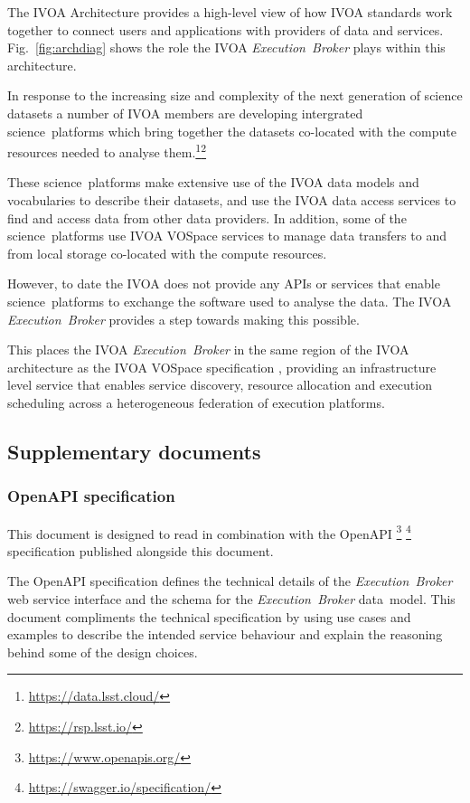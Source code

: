 \documentclass[11pt,a4paper]{ivoa}
\newcommand{\openapi} {OpenAPI}
\newcommand{\datamodel} {data~model}
\newcommand{\webservice} {web service}
\newcommand{\ivoa} {IVOA}
\newcommand{\vospace} {VOSpace}
\newcommand{\executionbroker} {\textit{Execution~Broker}}
\newcommand{\footurl}[1] {\footnote{\url{#1}}}
\newcommand{\dataset}[1] {dataset#1}
\newcommand{\scienceplatform}[1] {science~platform#1}
\begin{document}
The \ivoa{} Architecture\citep{2010ivoa.rept.1123A} provides a high-level view of how \ivoa{}
standards work together to connect users and applications with providers of data
and services.
Fig.~\ref{fig:archdiag} shows the role the \ivoa{} \executionbroker{} plays within this architecture.

In response to the increasing size and complexity of the next generation of science \dataset{s}
a number of \ivoa{} members are developing intergrated \scienceplatform{s} which bring
together the \dataset{s} co-located with the compute resources needed to analyse
them.\footurl{https://data.lsst.cloud/}\footurl{https://rsp.lsst.io/}

These \scienceplatform{s} make extensive use of the \ivoa{} data models and
vocabularies to describe their \dataset{s}, and use the \ivoa{} data access
services to find and access data from other data providers.
In addition, some of the \scienceplatform{s} use \ivoa{} \vospace{} services to manage
data transfers to and from local storage co-located with the compute resources.

However, to date the \ivoa{} does not provide any APIs or services that
enable \scienceplatform{s} to exchange the software used to analyse the data.
The \ivoa{} \executionbroker{} provides a step towards making this possible.

This places the \ivoa{} \executionbroker{} in the same region of the \ivoa{} architecture
as the \ivoa{} \vospace{} specification \citep{2009ivoa.specQ1007G},
providing an infrastructure level service that enables service discovery,
resource allocation and execution scheduling across a heterogeneous federation
of execution platforms.

\subsection{Supplementary documents}
\label{sub-supplementary-documents}

\subsubsection{\openapi{} specification}
\label{subsub-openapi-specification}

This document is designed to read in combination with the \openapi{}
\footurl{https://www.openapis.org/} \footurl{https://swagger.io/specification/}
specification published alongside this document.

The \openapi{} specification defines the technical details of the
\executionbroker{} \webservice{} interface and the schema for the
\executionbroker{} \datamodel{}.
This document compliments the technical specification by using use cases
and examples to describe the intended service behaviour and
explain the reasoning behind some of the design choices.
\end{document}
